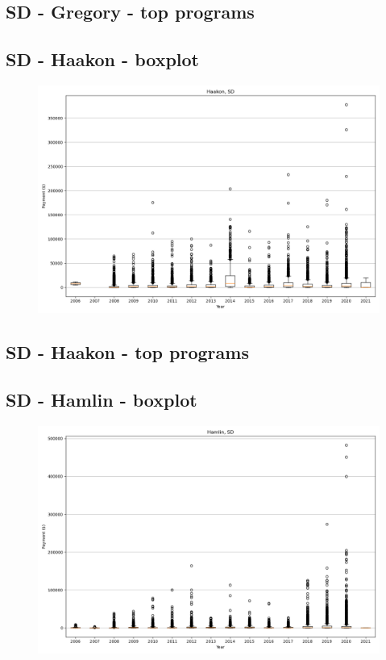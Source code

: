 \subsection*{SD - Gregory - top programs}

\newpage
\subsection*{SD - Haakon - boxplot}
\begin{figure}[h]
\centering
\includegraphics[width=7in]{../output/boxplots/counties/Haakon-SD_boxplot.png}
\end{figure}


\subsection*{SD - Haakon - top programs}

\newpage
\subsection*{SD - Hamlin - boxplot}
\begin{figure}[h]
\centering
\includegraphics[width=7in]{../output/boxplots/counties/Hamlin-SD_boxplot.png}
\end{figure}


